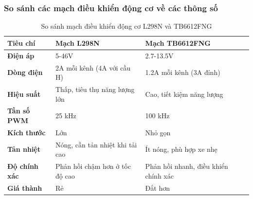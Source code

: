             \subsubsection{So sánh các mạch điều khiển động cơ về các thông số}
                \begin{table}[H]
                    \centering
                    \begin{tabular}{|p{3cm}|p{4cm}|p{4cm}|}
                        \hline
                        \textbf{Tiêu chí} & \textbf{Mạch L298N} & \textbf{Mạch TB6612FNG} \\
                        \hline
                        \textbf{Điện áp} & 5-46V & 2.7-13.5V \\
                        \hline
                        \textbf{Dòng điện} & 2A mỗi kênh (4A với cầu H) & 1.2A mỗi kênh (3A đỉnh) \\
                        \hline
                        \textbf{Hiệu suất} & Thấp, tiêu thụ năng lượng lớn & Cao, tiết kiệm năng lượng \\
                        \hline
                        \textbf{Tần số PWM} & 25 kHz & 100 kHz \\
                        \hline
                        \textbf{Kích thước} & Lớn & Nhỏ gọn \\
                        \hline
                        \textbf{Tản nhiệt} & Nóng, cần tản nhiệt khi tải cao & Ít nóng, phù hợp xe nhẹ \\
                        \hline
                        \textbf{Độ chính xác} & Phản hồi chậm hơn ở tốc độ cao & Phản hồi nhanh, điều khiển chính xác \\
                        \hline
                        \textbf{Giá thành} & Rẻ& Đắt hơn \\
                        \hline
                        \end{tabular}
                    \caption{So sánh mạch điều khiển động cơ L298N và TB6612FNG}
                    \label{tab:compare_motor_driver}
                \end{table}
